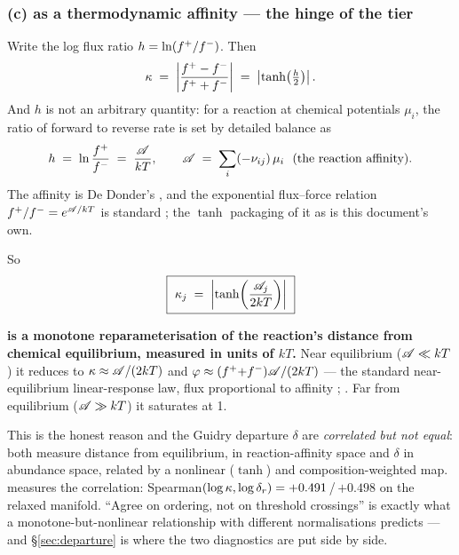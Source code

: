 \subsubsection{(c) \texorpdfstring{\kap}{kappa} as a thermodynamic affinity ---
               the hinge of the tier}
\label{sec:kappa-affinity}

Write the log flux ratio $h = \ln(f^{+}/f^{-})$. Then
%
\begin{equation}
\kappa \;=\; \left|\frac{f^{+}-f^{-}}{f^{+}+f^{-}}\right|
\;=\; \left|\tanh\!\left(\tfrac{h}{2}\right)\right| .
\label{eq:kappatanhh}
\end{equation}
%
And $h$ is not an arbitrary quantity: for a reaction at chemical potentials
$\mu_i$, the ratio of forward to reverse rate is set by detailed balance as
%
\begin{equation}
h \;=\; \ln\frac{f^{+}}{f^{-}} \;=\; \frac{\mathscr{A}}{kT},\qquad
\mathscr{A} \;=\; \sum_i (-\nu_{ij})\,\mu_i \ \ \text{(the reaction affinity)} .
\label{eq:affinity}
\end{equation}
%
The affinity is De Donder's \citep{dedonder1936}, and the exponential
flux--force relation $f^{+}/f^{-} = e^{\mathscr{A}/kT}$ is standard \citep{schnakenberg1976,
beard2007}; the $\tanh$ packaging of it as \kap{} is this document's own.

So
%
\begin{equation}
\boxed{\ \kappa_j \;=\; \left|\tanh\!\left(\frac{\mathscr{A}_j}{2kT}\right)\right|\ }
\label{eq:kappatanh}
\end{equation}

\begin{result}
\textbf{\kap{} is a monotone reparameterisation of the reaction's distance from
chemical equilibrium, measured in units of $kT$.}\derivedhere{} Near equilibrium
($\mathscr{A} \ll kT$) it reduces to $\kappa \approx \mathscr{A}/(2kT)$ and
$\varphi \approx (f^{+}{+}f^{-})\mathscr{A}/(2kT)$ --- the standard near-equilibrium
linear-response law, flux proportional to affinity \citep[for the general
framework]{onsager1931}; \citep[ch.~16, for the chemical-reaction
form]{kondepudi1998}. Far from equilibrium ($\mathscr{A} \gg kT$) it saturates at 1.
\end{result}

This is the honest reason \kap{} and the Guidry departure $\delta$ are
\emph{correlated but not equal}: both measure distance from equilibrium, \kap{}
in reaction-affinity space and $\delta$ in abundance space, related by a
nonlinear ($\tanh$) and composition-weighted map. 
measures the correlation: Spearman$(\log\kappa, \log\delta_r) =
+0.491$\,/\,$+0.498$ on the relaxed manifold. ``Agree on ordering, not on
threshold crossings'' is exactly what a monotone-but-nonlinear relationship with
different normalisations predicts --- and \S\ref{sec:departure} is where the two
diagnostics are put side by side.

